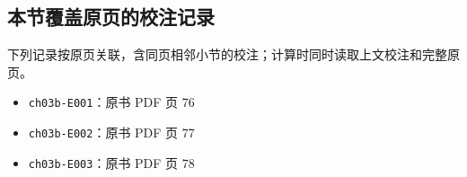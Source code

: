 \documentclass[
  10pt,
  fontset=fandol]{ctexart}
\providecommand{\tightlist}{%
  \setlength{\itemsep}{0pt}\setlength{\parskip}{0pt}}
\begin{document}
\subsection{本节覆盖原页的校注记录}\label{ux672cux8282ux8986ux76d6ux539fux9875ux7684ux6821ux6ce8ux8bb0ux5f55}

下列记录按原页关联，含同页相邻小节的校注；计算时同时读取上文校注和完整原页。

\begin{itemize}
\tightlist
\item
  \texttt{ch03b-E001}：原书 PDF 页 76
\item
  \texttt{ch03b-E002}：原书 PDF 页 77
\item
  \texttt{ch03b-E003}：原书 PDF 页 78
\end{itemize}
\end{document}
